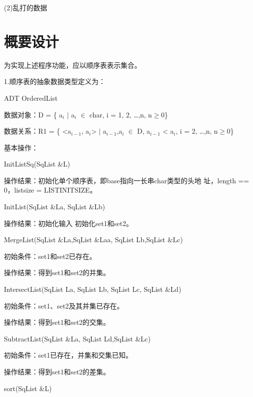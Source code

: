 \documentclass[11pt,letterpaper]{ctexart}
\begin{document}
      \indent\indent(2)乱打的数据
    \section{概要设计}
    为实现上述程序功能，应以顺序表表示集合。

    1.顺序表的抽象数据类型定义为：

    ADT OrderedList{

\indent\indent   数据对象：D = \{ a$_i$ $\mid$ a$_i$ $\in$ char, i = 1, 2, \ldots,n, n$\geq$0\}

\indent\indent   数据关系：R1 = \{ <a$_{i-1}$, a$_i$> $\mid$ a$_{i-1}$,a$_i$ $\in$ D, a$_{i-1}$ < a$_i$, i = 2, \ldots,n, n$\geq$0\}

\indent\indent   基本操作：

\indent\indent\indent   InitList\underline{\hspace{0.5em}}Sq(SqList \&L)

\indent\indent\indent\indent 操作结果：初始化单个顺序表，即base指向一长串char类型的头地
\indent\indent\indent\indent 址，length == 0，listsize = LIST\underline{\hspace{0.5em}}INIT\underline{\hspace{0.5em}}SIZE。

\indent\indent\indent   InitList(SqList \&La, SqList \&Lb)

\indent\indent\indent\indent 操作结果：初始化输入 初始化set1和set2。

\indent\indent\indent   MergeList(SqList \&La,SqList \&Laa, SqList Lb,SqList \&Lc)

\indent\indent\indent\indent 初始条件：set1和set2已存在。

\indent\indent\indent\indent 操作结果：得到set1和set2的并集。

\indent\indent\indent   IntersectList(SqList La, SqList Lb, SqList Lc, SqList \&Ld)

\indent\indent\indent\indent 初始条件：set1、set2及其并集已存在。

\indent\indent\indent\indent 操作结果：得到set1和set2的交集。

\indent\indent\indent   SubtractList(SqList \&La, SqList Ld,SqList \&Lc)

\indent\indent\indent\indent 初始条件：set1已存在，并集和交集已知。

\indent\indent\indent\indent 操作结果：得到set1和set2的差集。

\indent\indent\indent   sort(SqList \&L)

}
\end{document}

